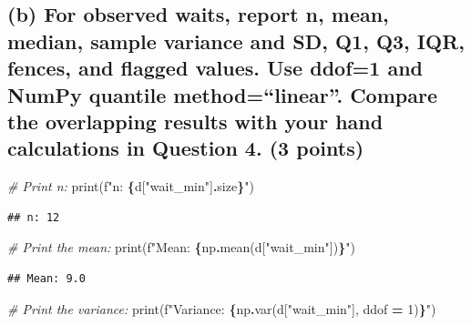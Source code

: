 \documentclass[
]{article}
\newenvironment{Shaded}{\begin{snugshade}}{\end{snugshade}}
\newcommand{\BuiltInTok}[1]{#1}
\newcommand{\CommentTok}[1]{\textcolor[rgb]{0.56,0.35,0.01}{\textit{#1}}}
\newcommand{\DecValTok}[1]{\textcolor[rgb]{0.00,0.00,0.81}{#1}}
\newcommand{\NormalTok}[1]{#1}
\newcommand{\OperatorTok}[1]{\textcolor[rgb]{0.81,0.36,0.00}{\textbf{#1}}}
\newcommand{\SpecialCharTok}[1]{\textcolor[rgb]{0.81,0.36,0.00}{\textbf{#1}}}
\newcommand{\SpecialStringTok}[1]{\textcolor[rgb]{0.31,0.60,0.02}{#1}}
\newcommand{\StringTok}[1]{\textcolor[rgb]{0.31,0.60,0.02}{#1}}
\begin{document}
\subsection{(b) For observed waits, report n, mean, median, sample
variance and SD, Q1, Q3, IQR, fences, and flagged values. Use ddof=1 and
NumPy quantile method=``linear''. Compare the overlapping results with
your hand calculations in Question 4. (3
points)}\label{b-for-observed-waits-report-n-mean-median-sample-variance-and-sd-q1-q3-iqr-fences-and-flagged-values.-use-ddof1-and-numpy-quantile-methodlinear.-compare-the-overlapping-results-with-your-hand-calculations-in-question-4.-3-points}

\begin{Shaded}
\begin{Highlighting}[]
\CommentTok{\# Print n:}
\BuiltInTok{print}\NormalTok{(}\SpecialStringTok{f"n: }\SpecialCharTok{\{}\NormalTok{d[}\StringTok{"wait\_min"}\NormalTok{]}\SpecialCharTok{.}\NormalTok{size}\SpecialCharTok{\}}\SpecialStringTok{"}\NormalTok{)}
\end{Highlighting}
\end{Shaded}

\begin{verbatim}
## n: 12
\end{verbatim}

\begin{Shaded}
\begin{Highlighting}[]
\CommentTok{\# Print the mean:}
\BuiltInTok{print}\NormalTok{(}\SpecialStringTok{f"Mean: }\SpecialCharTok{\{}\NormalTok{np}\SpecialCharTok{.}\NormalTok{mean(d[}\StringTok{"wait\_min"}\NormalTok{])}\SpecialCharTok{\}}\SpecialStringTok{"}\NormalTok{)}
\end{Highlighting}
\end{Shaded}

\begin{verbatim}
## Mean: 9.0
\end{verbatim}

\begin{Shaded}
\begin{Highlighting}[]
\CommentTok{\# Print the variance:}
\BuiltInTok{print}\NormalTok{(}\SpecialStringTok{f"Variance: }\SpecialCharTok{\{}\NormalTok{np}\SpecialCharTok{.}\NormalTok{var(d[}\StringTok{"wait\_min"}\NormalTok{], ddof }\OperatorTok{=} \DecValTok{1}\NormalTok{)}\SpecialCharTok{\}}\SpecialStringTok{"}\NormalTok{)}
\end{Highlighting}
\end{Shaded}
\end{document}
